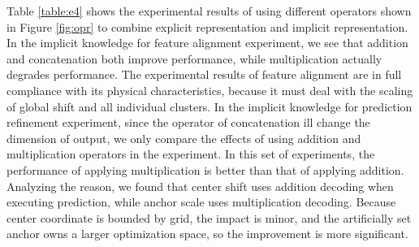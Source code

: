 \documentclass[10pt,twocolumn,letterpaper]{article}
\begin{document}
Table \ref{table:e4} shows the experimental results of using different operators shown in Figure \ref{fig:opr} to combine explicit representation and implicit representation. In the implicit knowledge for feature alignment experiment, we see that addition and concatenation both improve performance, while multiplication actually degrades performance. The experimental results of feature alignment are in full compliance with its physical characteristics, because it must deal with the scaling of global shift and all individual clusters. In the implicit knowledge for prediction refinement experiment, since the operator of concatenation ill change the dimension of output, we only compare the effects of using addition and multiplication operators in the experiment. In this set of experiments, the performance of applying multiplication is better than that of applying addition. Analyzing the reason, we found that center shift uses addition decoding when executing prediction, while anchor scale uses multiplication decoding. Because center coordinate is bounded by grid, the impact is minor, and the artificially set anchor owns a larger optimization space, so the improvement is more significant.
\end{document}
